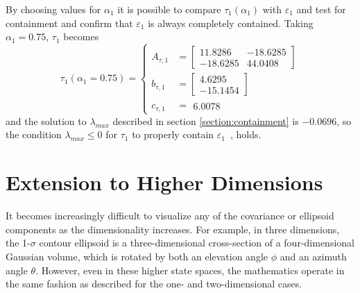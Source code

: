 \begin{example}
By choosing values for $\alpha_1$ it is possible to compare $\tau_1(\alpha_1)$ with $\varepsilon_1$ and test for
containment and confirm that $\varepsilon_1$ is always completely contained. Taking $\alpha_1=0.75$, $\tau_1$ becomes
\begin{equation}
    \tau_1(\alpha_1=0.75)=\left\{
        \begin{aligned}
            A_{\tau,1} &=
            \left[\begin{smallmatrix}
                 11.8286 & -18.6285\\
                -18.6285 &  44.0408
            \end{smallmatrix}\right]\\
            b_{\tau,1} &=
            \left[\begin{smallmatrix}
                  4.6295\\
                -15.1454
            \end{smallmatrix}\right]\\
            c_{\tau,1} &=  \begin{smallmatrix}6.0078\end{smallmatrix}
        \end{aligned}\right.
\end{equation}
and the solution to $\lambda_{max}$ described in section \ref{section:containment} is $-0.0696$, so the condition
$\lambda_{max}\leq 0$ for $\tau_1$ to properly contain $\varepsilon_1$~\cite{eberly00}, holds.


\end{example}


\section{Extension to Higher Dimensions}


It becomes increasingly difficult to visualize any of the covariance or ellipsoid components as the dimensionality
increases. For example, in three dimensions, the 1-$\sigma$ contour ellipsoid is a three-dimensional cross-section of a
four-dimensional Gaussian volume, which is rotated by both an elevation angle $\phi$ and an azimuth angle
$\theta$. However, even in these higher state spaces, the mathematics operate in the same fashion as described for the
one- and two-dimensional cases.

